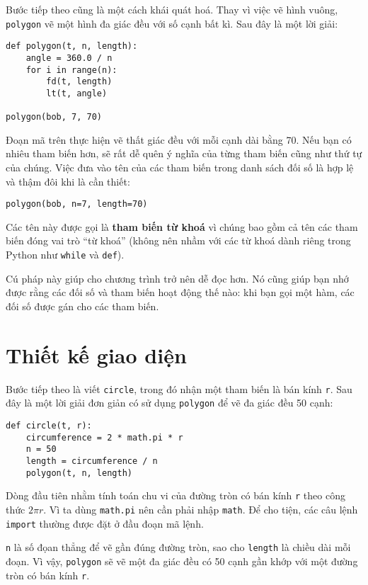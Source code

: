 \documentclass[11pt]{book}
\begin{document}

Bước tiếp theo cũng là một cách khái quát hoá. Thay vì việc vẽ
hình vuông, {\tt polygon} vẽ một hình đa giác đều với số cạnh 
bất kì. Sau đây là một lời  giải:

\beforeverb
\begin{verbatim}
def polygon(t, n, length):
    angle = 360.0 / n
    for i in range(n):
        fd(t, length)
        lt(t, angle)

polygon(bob, 7, 70)
\end{verbatim}
\afterverb
%
Đoạn mã trên thực hiện vẽ thất giác đều với mỗi cạnh dài bằng 70.
Nếu bạn có nhiêu tham biến hơn, sẽ rất dễ quên ý nghĩa của từng
tham biến cũng như thứ tự của chúng. Việc đưa vào tên của các
tham biến trong danh sách đối số là hợp lệ và thậm đôi khi là cần thiết:

\beforeverb
\begin{verbatim}
polygon(bob, n=7, length=70)
\end{verbatim}
\afterverb
%
Các tên này được gọi là {\bf tham biến từ khoá} vì chúng bao gồm cả
tên các tham biến đóng vai trò ``từ khoá'' (không nên nhầm với các
từ khoá dành riêng trong Python như {\tt while} và {\tt def}).


Cú pháp này giúp cho chương trình trở nên dễ đọc hơn. Nó cũng giúp
bạn nhớ được rằng các đối số và tham biến hoạt động thế nào: khi bạn
gọi  một hàm, các đối số được gán cho các tham biến.


\section{Thiết kế giao diện}

Bước tiếp theo là viết {\tt circle}, trong đó nhận một tham biến là
bán kính {\tt r}. Sau đây là một lời giải đơn giản có sử dụng 
{\tt polygon} để vẽ đa giác đều 50 cạnh:

\beforeverb
\begin{verbatim}
def circle(t, r):
    circumference = 2 * math.pi * r
    n = 50
    length = circumference / n
    polygon(t, n, length)
\end{verbatim}
\afterverb
%
Dòng đầu tiên nhằm tính toán chu vi của đường tròn có bán kính
{\tt r} theo công thức $2 \pi r$.  Vì ta dùng {\tt math.pi} nên cần phải 
nhập {\tt math}.  Để cho tiện, các câu lệnh {\tt import} thường được
đặt ở đầu đoạn mã lệnh.

{\tt n} là số đọan thẳng để vẽ gần đúng đường tròn, sao cho 
{\tt length} là chiều dài mỗi đoạn.  Vì vậy, {\tt polygon} sẽ vẽ 
một đa giác đều có 50 cạnh gần khớp với một đường tròn có bán kính {\tt r}.
\end{document}
